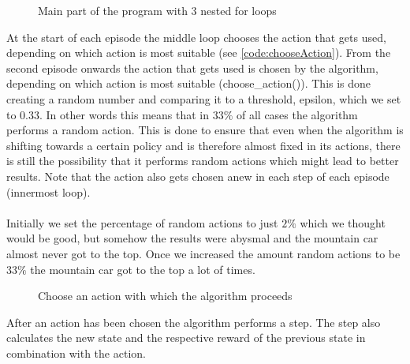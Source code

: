 \documentclass{article}
\begin{document}
	\begin{figure}
		\caption{Main part of the program with 3 nested for loops}
		\label{code:loops}
		
	\end{figure}
	
	\FloatBarrier
	
	\noindent At the start of each episode the middle loop chooses the action that gets used, depending on which action is most suitable (see \autoref{code:chooseAction}). From the second episode onwards the action that gets used is chosen by the algorithm, depending on which action is most suitable (choose\_action()). This is done creating a random number and comparing it to a threshold, epsilon, which we set to $0.33$. In other words this means that in $33\%$ of all cases the algorithm performs a random action. This is done to ensure that even when the algorithm is shifting towards a certain policy and is therefore almost fixed in its actions, there is still the possibility that it performs random actions which might lead to better results. Note that the action also gets chosen anew in each step of each episode (innermost loop). \\
	\\
	Initially we set the percentage of random actions to just $2\%$ which we thought would be good, but somehow the results were abysmal and the mountain car almost never got to the top. Once we increased the amount random actions to be $33\%$ the mountain car got to the top a lot of times. 
	
	\begin{figure}
		\caption{Choose an action with which the algorithm proceeds}
		\label{code:chooseAction}
		
	\end{figure}
	\newpage
	
	\noindent After an action has been chosen the algorithm performs a step. The step also calculates the new state and the respective reward of the previous state in combination with the action.
	
\end{document}
